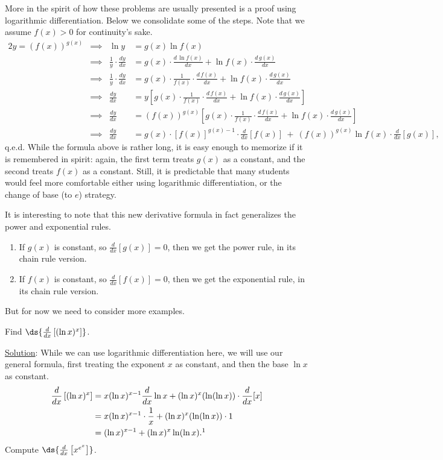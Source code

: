 More in the spirit of how these problems are usually presented is a
proof using logarithmic differentiation.  Below we consolidate
some of the steps.  Note that we assume $f(x)>0$ for continuity's sake.
\begin{alignat*}{2}
y=(f(x))^{g(x)}&\implies&\ln y&=g(x)\ln f(x)\\
 &\implies&\frac{1}{y}\cdot\frac{dy}{dx}
  &=g(x)\cdot\frac{d\,\ln f(x)}{dx}+\ln f(x)\cdot\frac{d\,g(x)}{dx}\\
 &\implies&\frac{1}{y}\cdot\frac{dy}{dx}
  &=g(x)\cdot\frac{1}{f(x)}\cdot\frac{d\,f(x)}{dx}
     +\ln f(x)\cdot\frac{d\,g(x)}{dx}\\
 &\implies&\frac{dy}{dx}&=y\left[g(x)\cdot\frac{1}{f(x)}\cdot\frac{d\,f(x)}{dx}
     +\ln f(x)\cdot\frac{d\,g(x)}{dx}\right]\\
 &\implies&\frac{dy}{dx}&=(f(x))^{g(x)}
 \left[g(x)\cdot\frac{1}{f(x)}\cdot\frac{d\,f(x)}{dx}
     +\ln f(x)\cdot\frac{d\,g(x)}{dx}\right]\\
 &\implies&\frac{dy}{dx}&=
  g(x)\cdot[f(x)]^{g(x)-1}\cdot\frac{d}{dx}[f(x)]
    \ +\ (f(x))^{g(x)}\ln f(x)\cdot\frac{d}{dx}[g(x)],
\end{alignat*}
q.e.d.  While the formula above is rather long, it is easy enough
to memorize if it is remembered in spirit:  again, the
first term treats $g(x)$ as a constant, and the second treats
$f(x)$ as a constant.  Still, it is predictable that many
students would feel more comfortable either using logarithmic
differentiation, or the change of base (to $e$) strategy.

It is interesting to note that this new derivative formula
in fact generalizes the power and exponential rules.
\begin{enumerate}
\item If $g(x)$ is constant, so $\frac{d}{dx}[g(x)]=0$, then
we get the power rule, in its chain rule version.
\item If $f(x)$ is constant, so $\frac{d}{dx}[f(x)]=0$, then
we get the exponential rule, in its chain rule version.
\end{enumerate}

But for now we need to consider more examples.

\bex Find $\ds{\frac{d}{dx}\left[(\ln x)^x\right]}$.

\underline{Solution}: While we can use logarithmic differentiation
here, we will use our general formula, first treating the 
exponent $x$ as constant, and then the base $\ln x$ as constant.
\begin{align*}
\frac{d}{dx}\left[(\ln x)^x\right]
 &=x(\ln x)^{x-1}\frac{d}{dx}\ln x+(\ln x)^x(\ln(\ln x))\cdot\frac{d}{dx}[x]\\
 &=x(\ln x)^{x-1}\cdot\frac1x+(\ln x)^x(\ln(\ln x))\cdot1\\
 &=(\ln x)^{x-1}+(\ln x)^x\ln(\ln x).\footnotemark
\end{align*}
\eex
{}
\bex Compute $\ds{\frac{d}{dx}\left[x^{e^x}\right]}$.

